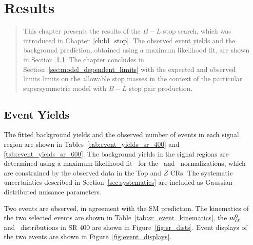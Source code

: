 \chapter[Results][Results]{Results}
\label{ch:results}

\begin{quote}
  This chapter presents the results of the $B-L$ stop search, which was
  introduced in Chapter~\ref{ch:bl_stop}.
  The observed event yields and the background prediction, obtained using a
  maximum likelihood fit, are shown in Section~\ref{sec:event_yields}.
  The chapter concludes in Section~\ref{sec:model_dependent_limits} with the
  expected and observed limits limits on the allowable stop masses in the
  context of the particular supersymmetric model with $B-L$ stop pair
  production.
\end{quote}

\FloatBarrier
\section[Event yields][Event yields]{Event Yields}
\label{sec:event_yields}

The fitted background yields and the observed number of events in each
signal region are shown in Tables~\ref{tab:event_yields_sr_400} and
\ref{tab:event_yields_sr_600}.
The background yields in the signal regions are determined using a maximum
likelihood fit~\cite{Baak:2014wma} for the \TTBAR\ and
\ZGAMMAJETS\ normalizations, which are constrained by the observed data in the
Top and $Z$ CRs.
The systematic uncertainties described in Section~\ref{sec:systematics} are
included as Gaussian-distributed nuisance parameters.

Two events are observed, in agreement with the SM prediction.
The kinematics of the two selected events are shown in
Table~\ref{tab:sr_event_kinematics}, the $m_{b\ell}^0$ and \HT\ distributions in
SR 400 are shown in Figure~\ref{fig:sr_dists}.
Event displays of the two events are shown in Figure~\ref{fig:event_displays}.

